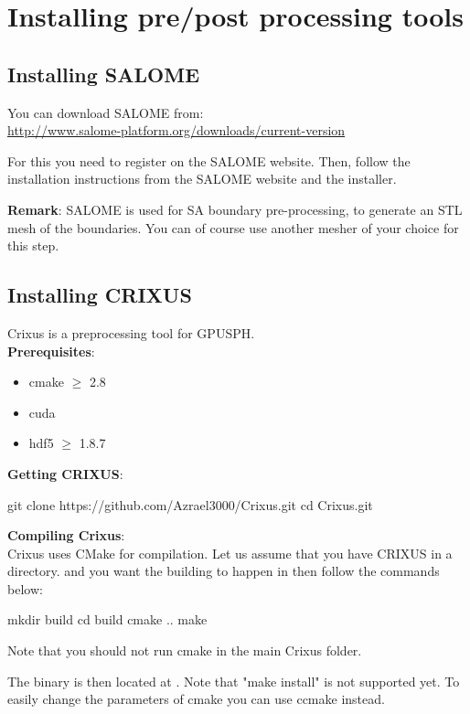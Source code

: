\section{Installing pre/post processing tools}

\subsection{Installing SALOME}
You can download SALOME from:\\
\url{http://www.salome-platform.org/downloads/current-version}

For this you need to register on the SALOME website.
Then, follow the installation instructions from the SALOME website and the
installer.

\textbf{Remark}: SALOME is used for SA boundary pre-processing, to generate an
STL mesh of the boundaries. You can of course use another mesher of your 
choice for this step.

\subsection{Installing CRIXUS}
Crixus is a preprocessing tool for GPUSPH. \\

\textbf{Prerequisites}:
\begin{itemize}
\item cmake $\ge$ 2.8
\item cuda
\item hdf5 $\ge$ 1.8.7
\end{itemize}

\textbf{Getting CRIXUS}:
\begin{shellcode}
git clone https://github.com/Azrael3000/Crixus.git
cd Crixus.git
\end{shellcode}

\textbf{Compiling Crixus}: \\
Crixus uses CMake for compilation. 
Let us assume that you have CRIXUS in a  directory. 
and you want the building to happen in  then follow the commands below:
\begin{shellcode}
mkdir build
cd build
cmake ..
make
\end{shellcode}
Note that you should not run cmake in the main Crixus folder.

The binary is then located at .
Note that "make install" is not supported yet. To easily change the parameters of cmake you can use ccmake instead.


